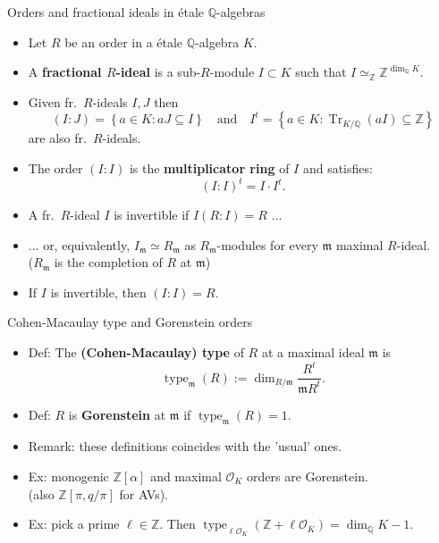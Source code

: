 \documentclass[usenames,dvipsnames]{beamer}
\def\Q{\mathbb{Q}}
\def\Z{\mathbb{Z}}
\DeclareMathOperator{\Tr}{Tr}
\DeclareMathOperator{\type}{type}
\newcommand{\cO}{{\mathcal O}}
\renewcommand{\frm}{{\mathfrak m}}
\newcommand{\set}[1]{\left\lbrace#1\right\rbrace }
\begin{document}
\begin{frame}{ Orders and fractional ideals in \'etale $\Q$-algebras } 
    \begin{itemize}
    \item \pause Let $R$ be an order in a \'etale $\Q$-algebra $K$.
    \item \pause A {\bf fractional $R$-ideal} is a sub-$R$-module $I\subset K$ such that $I\simeq_\Z\Z^{\dim_\Q K}$.
    \item \pause Given fr.~$R$-ideals $I,J$ then 
    $$(I:J)=\set{a \in K : aJ\subseteq I}
    \quad \text{and}\quad I^t=\set{a \in K : \Tr_{K/\Q}(a I)\subseteq \Z}$$
    are also fr.~$R$-ideals.
    \item \pause The order $(I:I)$ is the {\bf multiplicator ring} of $I$ and satisfies: 
    $$(I:I)^t = I\cdot I^t.$$
    \item \pause A fr.~$R$-ideal $I$ is invertible if $I(R:I)=R$ ...
    \item \pause ... or, equivalently, $I_\frm \simeq R_\frm$ as $R_\frm$-modules for every $\frm$ maximal $R$-ideal.\\
        ($R_\frm$ is the completion of $R$ at $\frm$)
    \item \pause If $I$ is invertible, then $(I:I)=R$.
	\end{itemize}
\end{frame}

\begin{frame}{ Cohen-Macaulay type and Gorenstein orders } 
    \begin{itemize}
    \item Def: The {\bf (Cohen-Macaulay) type} of $R$ at a maximal ideal $\frm$ is
        \[ \type_\frm (R) := \dim_{R/\frm} \frac{R^t}{\frm R^t}. \]
    \item \pause Def: $R$ is {\bf Gorenstein} at $\frm$ if $\type_\frm(R)=1$.
    \item \pause Remark: these definitions coincides with the 'usual' ones.
    \item \pause Ex: monogenic $\Z[\alpha]$ and maximal $\cO_K$ orders are Gorenstein.\\
    (also $\Z[\pi,q/\pi]$ for AVs).
    \item \pause Ex: pick a prime $\ell\in\Z$. Then $\type_{\ell\cO_K}(\Z+\ell\cO_K) = \dim_\Q K-1$.
	\end{itemize}
\end{frame}
\end{document}
